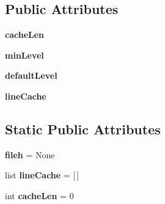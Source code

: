 \subsection*{Public Attributes}
\begin{DoxyCompactItemize}
\item 
\hypertarget{classcheshire3_1_1logger_1_1_simple_logger_a25887ce2abe700cbd0763eac6513ee7f}{{\bfseries cache\-Len}}\label{classcheshire3_1_1logger_1_1_simple_logger_a25887ce2abe700cbd0763eac6513ee7f}

\item 
\hypertarget{classcheshire3_1_1logger_1_1_simple_logger_a02c40260624c321c8d895605cfbb461c}{{\bfseries min\-Level}}\label{classcheshire3_1_1logger_1_1_simple_logger_a02c40260624c321c8d895605cfbb461c}

\item 
\hypertarget{classcheshire3_1_1logger_1_1_simple_logger_a694ee578214d52f1ff8399021b49e90d}{{\bfseries default\-Level}}\label{classcheshire3_1_1logger_1_1_simple_logger_a694ee578214d52f1ff8399021b49e90d}

\item 
\hypertarget{classcheshire3_1_1logger_1_1_simple_logger_ab1017dfa0e59397bb462bebfb4d65e37}{{\bfseries line\-Cache}}\label{classcheshire3_1_1logger_1_1_simple_logger_ab1017dfa0e59397bb462bebfb4d65e37}

\end{DoxyCompactItemize}
\subsection*{Static Public Attributes}
\begin{DoxyCompactItemize}
\item 
\hypertarget{classcheshire3_1_1logger_1_1_simple_logger_a5e5b24d893a3eb8d95f4cfed1c3234cb}{{\bfseries fileh} = None}\label{classcheshire3_1_1logger_1_1_simple_logger_a5e5b24d893a3eb8d95f4cfed1c3234cb}

\item 
\hypertarget{classcheshire3_1_1logger_1_1_simple_logger_a3a65941a29711c94077ddcdc5d2932ae}{list {\bfseries line\-Cache} = \mbox{[}$\,$\mbox{]}}\label{classcheshire3_1_1logger_1_1_simple_logger_a3a65941a29711c94077ddcdc5d2932ae}

\item 
\hypertarget{classcheshire3_1_1logger_1_1_simple_logger_a4455aff9f193c49df1b8b948cf181a3a}{int {\bfseries cache\-Len} = 0}\label{classcheshire3_1_1logger_1_1_simple_logger_a4455aff9f193c49df1b8b948cf181a3a}

\end{DoxyCompactItemize}


